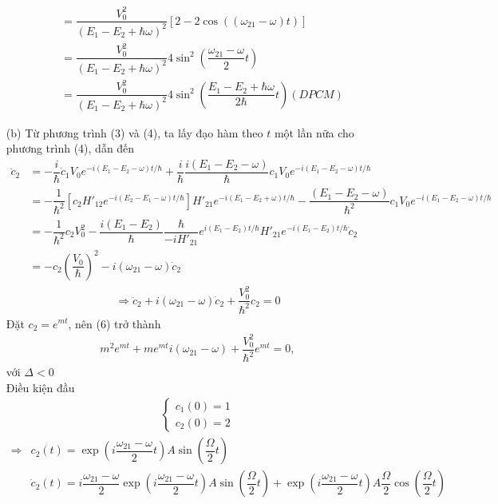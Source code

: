 \documentclass{article}
\newcommand{\f}[2]{\dfrac{#1}{#2}}
\begin{document}
\begin{enumerate}
\begin{align*}
		&= \f{V_{0}^2}{(E_{1} - E_{2} + \hbar \omega)^2} \left[2 - 2\cos((\omega_{21} - \omega)t)\right] \\
		&= \f{V_{0}^2}{(E_{1} - E_{2} + \hbar \omega)^2} 4 \sin^2\left( \f{\omega_{21} - \omega}{2}t \right) \\
		&= \f{V_{0}^2}{(E_{1} - E_{2} + \hbar \omega)^2} 4 \sin^2\left( \f{E_{1} - E_{2} + \hbar\omega}{2\hbar}t \right) (DPCM)
	\end{align*}
	\item [(b)] Từ phương trình (3) và (4), ta lấy đạo hàm theo $t$ một lần nữa cho phương trình (4), dẫn đến
	\begin{align*}
		\ddot{c}_{2} 
		&= - \f{i}{\hbar} \dot{c}_{1}V_{0} e^{-i(E_1 - E_2 - \omega) t / \hbar} + \f{i}{\hbar}\f{i(E_{1} - E_{2} - \omega)}{\hbar} c_{1} V_{0} e^{-i(E_1 - E_2 - \omega) t / \hbar} \\
		&= - \f{1}{\hbar^2} \left[ c_{2} H'_{12} e^{-i(E_2 - E_1 - \omega) t / \hbar} \right]H'_{21} e^{-i(E_1 - E_2 + \omega) t / \hbar} - \f{(E_{1} - E_{2} - \omega)}{\hbar^2} c_{1} V_{0} e^{-i(E_1 - E_2 - \omega) t / \hbar} \\
		&= - \f{1}{\hbar^2} c_{2} V_{0}^2  - \f{i(E_{1} - E_{2})}{\hbar}\f{\hbar}{-i H'_{21}}e^{i(E_1 - E_2) t / \hbar} H'_{21} e^{-i(E_1 - E_2) t / \hbar} \dot{c}_{2} \\
		&= -c_{2} \left(\f{V_{0}}{\hbar}\right)^2 - i (\omega_{21} - \omega)\dot{c}_{2}
	\end{align*}
	\begin{align*}
		\Rightarrow \ddot{c}_{2} + i(\omega_{21} - \omega)\dot{c}_{2} + \f{V_{0}^2}{\hbar^2}c_{2} = 0 \tag{6}
	\end{align*}
	Đặt $c_{2} = e^{mt}$, nên (6) trở thành
	\begin{align*}
		m^{2} e^{mt} + m e^{mt} i(\omega_{21} - \omega) +  \f{V_{0}^2}{\hbar^2} e^{mt} = 0 ,
	\end{align*}
	với $\Delta <0 $\\
	Điều kiện đầu
	\begin{align*}
		\begin{cases}
			c_{1}(0) = 1 \\
			c_{2}(0) = 2
		\end{cases}
	\end{align*}
	\begin{align*}
		\Rightarrow 
		&c_{2}(t) = \exp(i \f{\omega_{21} - \omega }{2} t) A \sin\left(\f{\Omega}{2}t\right)\\
		&\dot{c}_{2}(t) = i \f{\omega_{21} - \omega}{2}\exp\left(i \f{\omega_{21} - \omega}{2}t\right)A \sin\left(\f{\Omega}{2}t\right) + \exp\left(i \f{\omega_{21} - \omega}{2}t\right)A\f{\Omega}{2} \cos\left(\f{\Omega}{2}t\right)

\end{align*}
\end{enumerate}
\end{document}
